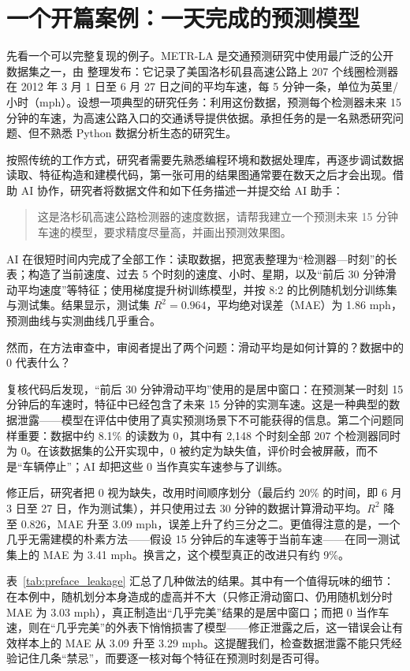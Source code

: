 \section*{一个开篇案例：一天完成的预测模型}

先看一个可以完整复现的例子。METR-LA 是交通预测研究中使用最广泛的公开数据集之一，由 \citet{li2018dcrnn}整理发布：它记录了美国洛杉矶县高速公路上 207 个线圈检测器在 2012 年 3 月 1 日至 6 月 27 日之间的平均车速，每 5 分钟一条，单位为英里/小时（mph）。设想一项典型的研究任务：利用这份数据，预测每个检测器未来 15 分钟的车速，为高速公路入口的交通诱导提供依据。承担任务的是一名熟悉研究问题、但不熟悉 Python 数据分析生态的研究生。

按照传统的工作方式，研究者需要先熟悉编程环境和数据处理库，再逐步调试数据读取、特征构造和建模代码，第一张可用的结果图通常要在数天之后才会出现。借助 AI 协作，研究者将数据文件和如下任务描述一并提交给 AI 助手：

\begin{quote}
这是洛杉矶高速公路检测器的速度数据，请帮我建立一个预测未来 15 分钟车速的模型，要求精度尽量高，并画出预测效果图。
\end{quote}

AI 在很短时间内完成了全部工作：读取数据，把宽表整理为“检测器—时刻”的长表；构造了当前速度、过去 5 个时刻的速度、小时、星期，以及“前后 30 分钟滑动平均速度”等特征；使用梯度提升树训练模型，并按 8:2 的比例随机划分训练集与测试集。结果显示，测试集 $R^2 = 0.964$，平均绝对误差（MAE）为 1.86 mph，预测曲线与实测曲线几乎重合。

然而，在方法审查中，审阅者提出了两个问题：滑动平均是如何计算的？数据中的 0 代表什么？

复核代码后发现，“前后 30 分钟滑动平均”使用的是居中窗口：在预测某一时刻 15 分钟后的车速时，特征中已经包含了未来 15 分钟的实测车速。这是一种典型的数据泄露——模型在评估中使用了真实预测场景下不可能获得的信息\cite{kaufman2012leakage,kapoor2023leakage}。第二个问题同样重要：数据中约 8.1\% 的读数为 0，其中有 2,148 个时刻全部 207 个检测器同时为 0。在该数据集的公开实现中，0 被约定为缺失值，评价时会被屏蔽，而不是“车辆停止”；AI 却把这些 0 当作真实车速参与了训练。

修正后，研究者把 0 视为缺失，改用时间顺序划分（最后约 20\% 的时间，即 6 月 3 日至 27 日，作为测试集），并只使用过去 30 分钟的数据计算滑动平均。$R^2$ 降至 0.826，MAE 升至 3.09 mph，误差上升了约三分之二。更值得注意的是，一个几乎无需建模的朴素方法——假设 15 分钟后的车速等于当前车速——在同一测试集上的 MAE 为 3.41 mph。换言之，这个模型真正的改进只有约 9\%。

表~\ref{tab:preface_leakage} 汇总了几种做法的结果。其中有一个值得玩味的细节：在本例中，随机划分本身造成的虚高并不大（只修正滑动窗口、仍用随机划分时 MAE 为 3.03 mph），真正制造出“几乎完美”结果的是居中窗口；而把 0 当作车速，则在“几乎完美”的外表下悄悄损害了模型——修正泄露之后，这一错误会让有效样本上的 MAE 从 3.09 升至 3.29 mph。这提醒我们，检查数据泄露不能只凭经验记住几条“禁忌”，而要逐一核对每个特征在预测时刻是否可得。

